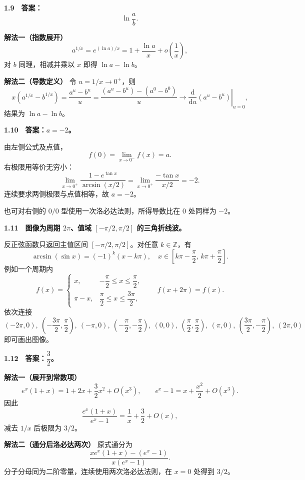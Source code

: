 \begin{solutionBox}
\textbf{1.9　答案：}
\[
\boxed{\ln\frac ab}.
\]

\textbf{解法一（指数展开）}
\[
a^{1/x}=e^{(\ln a)/x}=1+\frac{\ln a}{x}+o\!\left(\frac1x\right),
\]
对 \(b\) 同理，相减并乘以 \(x\) 即得 \(\ln a-\ln b\)。

\textbf{解法二（导数定义）}
令 \(u=1/x\to0^+\)，则
\[
x(a^{1/x}-b^{1/x})
=\frac{a^u-b^u}{u}
=\frac{(a^u-b^u)-(a^0-b^0)}{u}
\to\left.\frac{\mathrm d}{\mathrm du}(a^u-b^u)\right|_{u=0},
\]
结果为 \(\ln a-\ln b\)。
\end{solutionBox}

\begin{solutionBox}
\textbf{1.10　答案：\(a=-2\)。}

由左侧公式及点值，
\[
f(0)=\lim_{x\to0^-}f(x)=a.
\]
右极限用等价无穷小：
\[
\lim_{x\to0^+}\frac{1-e^{\tan x}}{\arcsin(x/2)}
=\lim_{x\to0^+}\frac{-\tan x}{x/2}=-2.
\]
连续要求两侧极限与点值相等，故 \(a=-2\)。

也可对右侧的 \(0/0\) 型使用一次洛必达法则，所得导数比在 \(0\) 处同样为 \(-2\)。
\end{solutionBox}

\begin{solutionBox}
\textbf{1.11　图像为周期 \(2\pi\)、值域 \([-\pi/2,\pi/2]\) 的三角折线波。}

反正弦函数只返回主值区间 \([-\pi/2,\pi/2]\)。对任意
\(k\in\mathbb Z\)，有
\[
\boxed{
\arcsin(\sin x)=(-1)^k(x-k\pi),
\quad
x\in\left[k\pi-\frac\pi2,\,k\pi+\frac\pi2\right].}
\]
例如一个周期内
\[
f(x)=
\begin{cases}
x,&-\dfrac\pi2\le x\le\dfrac\pi2,\\[4pt]
\pi-x,&\dfrac\pi2\le x\le\dfrac{3\pi}{2},
\end{cases}
\qquad f(x+2\pi)=f(x).
\]
依次连接
\[
(-2\pi,0),\ \left(-\frac{3\pi}{2},\frac\pi2\right),\ (-\pi,0),\
\left(-\frac\pi2,-\frac\pi2\right),\ (0,0),\
\left(\frac\pi2,\frac\pi2\right),\ (\pi,0),\
\left(\frac{3\pi}{2},-\frac\pi2\right),\ (2\pi,0)
\]
即可画出图像。
\end{solutionBox}

\begin{solutionBox}
\textbf{1.12　答案：\(\dfrac32\)。}

\textbf{解法一（展开到常数项）}
\[
e^x(1+x)=1+2x+\frac32x^2+O(x^3),
\qquad
e^x-1=x+\frac{x^2}{2}+O(x^3).
\]
因此
\[
\frac{e^x(1+x)}{e^x-1}
=\frac1x+\frac32+O(x),
\]
减去 \(1/x\) 后极限为 \(3/2\)。

\textbf{解法二（通分后洛必达两次）}
原式通分为
\[
\frac{xe^x(1+x)-(e^x-1)}{x(e^x-1)}.
\]
分子分母同为二阶零量，连续使用两次洛必达法则，在 \(x=0\) 处得到
\(3/2\)。
\end{solutionBox}

